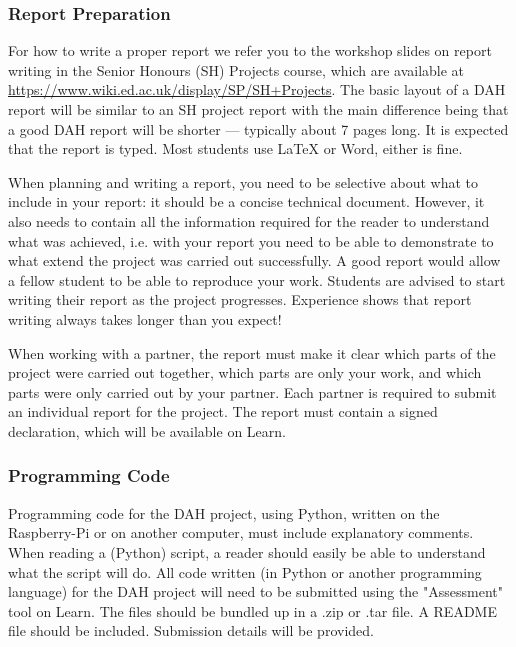 \subsubsection{Report Preparation}

For how to write a proper report we refer you to the workshop slides on report writing in the Senior Honours (SH) Projects course, which are available at \url{https://www.wiki.ed.ac.uk/display/SP/SH+Projects}.
The basic layout of a DAH report will be similar to an SH project report with the main difference being that a good DAH report will be shorter --- typically about 7 pages long.
It is expected that the report is typed.
Most students use LaTeX or Word, either is fine.

When planning and writing a report, you need to be selective about what to include in your report: it should be a concise technical document.
However, it also needs to contain all the information required for the reader to understand what was achieved, i.e. with your report you need to be able to demonstrate to what extend the project was carried out successfully.
A good report would allow a fellow student to be able to reproduce your work.
Students are advised to start writing their report as the project progresses.
Experience shows that report writing always takes longer than you expect!

When working with a partner, the report must make it clear which parts of the project were carried out together, which parts are only your work, and which parts were only carried out by your partner.
Each partner is required to submit an individual report for the project.
The report must contain a signed declaration, which will be available on Learn.

\subsubsection{Programming Code}

Programming code for the DAH project, using Python, written on the Raspberry-Pi or on another computer, must include explanatory comments.
When reading a (Python) script, a reader should easily be able to understand what the script will do.
All code written (in Python or another programming language) for the DAH project will need to be submitted using the "Assessment" tool on Learn.
The files should be bundled up in a .zip or .tar file.
A README file should be included.
Submission details will be provided.


